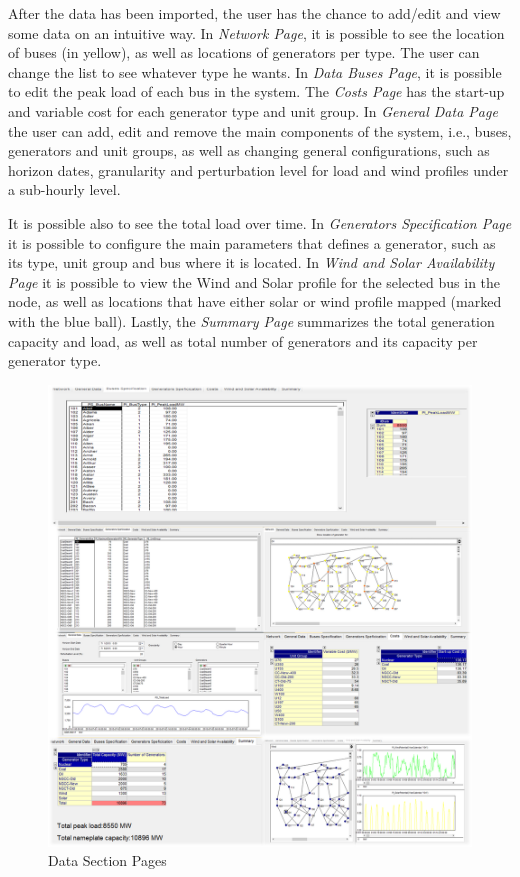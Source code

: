 \documentclass[12pt,LUDisStyle,twosided]{book}
\begin{document}
After the data has been imported, the user has the chance to add/edit and view some data on an intuitive way. In \textit{Network Page}, it is possible to see the location of buses (in yellow), as well as locations of generators per type. The user can change the list to see whatever type he wants. In \textit{Data Buses Page}, it is possible to edit the peak load of each bus in the system. The \textit{Costs Page} has the start-up and variable cost for each generator type and unit group. In \textit{General Data Page} the user can add, edit and remove the main components of the system, i.e., buses, generators and unit groups, as well as changing general configurations, such as horizon dates, granularity and perturbation level for load and wind profiles under a sub-hourly level. 

It is possible also to see the total load over time. In \textit{Generators Specification Page} it is possible to configure the main parameters that defines a generator, such as its type, unit group and bus where it is located. In \textit{Wind and Solar Availability Page} it is possible to view the Wind and Solar profile for the selected bus in the node, as well as locations that have either solar or wind profile mapped (marked with the blue ball). Lastly, the \textit{Summary Page} summarizes the total generation capacity and load, as well as total number of generators and its capacity per generator type.

\begin{figure}[h] 
	\begin{center}
		\includegraphics[width=\textwidth,height=\textheight,keepaspectratio]{aimmsDataPages.png}
	  	\caption{Data Section Pages}
     	\label{fig:dataSectionPages}
	\end{center}
\end{figure}
\end{document}
